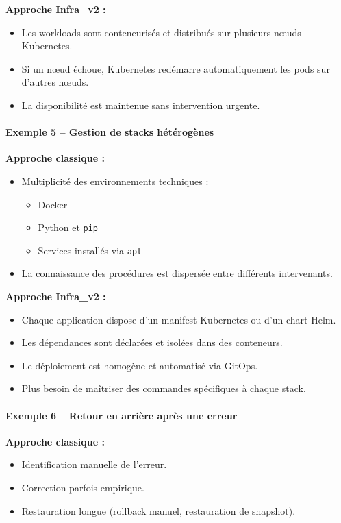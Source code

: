 \textbf{Approche Infra\_v2 :}
\begin{itemize}
	\item Les workloads sont conteneurisés et distribués sur plusieurs nœuds Kubernetes.
	\item Si un nœud échoue, Kubernetes redémarre automatiquement les pods sur d’autres nœuds.
	\item La disponibilité est maintenue sans intervention urgente.
\end{itemize}

\paragraph{Exemple 5 -- Gestion de stacks hétérogènes}

\textbf{Approche classique :}
\begin{itemize}
	\item Multiplicité des environnements techniques :
	      \begin{itemize}
		      \item Docker
		      \item Python et \texttt{pip}
		      \item Services installés via \texttt{apt}
	      \end{itemize}
	\item La connaissance des procédures est dispersée entre différents intervenants.
\end{itemize}

\textbf{Approche Infra\_v2 :}
\begin{itemize}
	\item Chaque application dispose d’un manifest Kubernetes ou d’un chart Helm.
	\item Les dépendances sont déclarées et isolées dans des conteneurs.
	\item Le déploiement est homogène et automatisé via GitOps.
	\item Plus besoin de maîtriser des commandes spécifiques à chaque stack.
\end{itemize}

\paragraph{Exemple 6 -- Retour en arrière après une erreur}

\textbf{Approche classique :}
\begin{itemize}
	\item Identification manuelle de l’erreur.
	\item Correction parfois empirique.
	\item Restauration longue (rollback manuel, restauration de snapshot).
\end{itemize}

